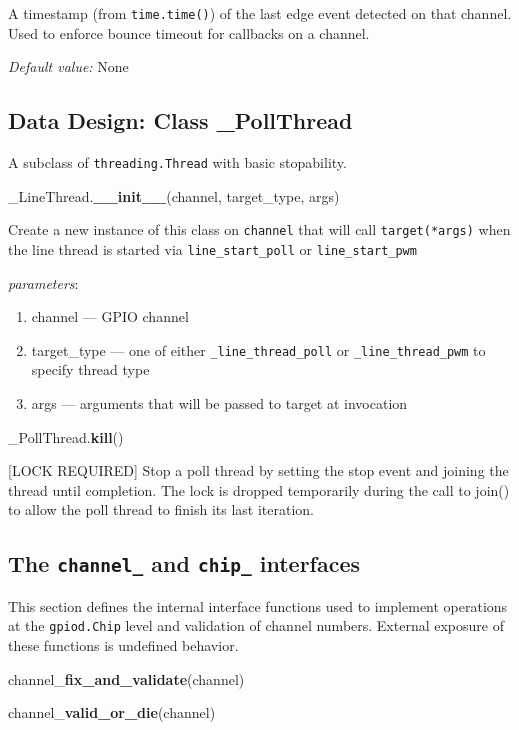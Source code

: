 \documentclass[12pt]{article}
\begin{document}
A timestamp (from \texttt{time.time()}) of the last edge event detected on that channel. Used to enforce bounce timeout for callbacks on a channel.

\textit{Default value:} None


\subsection{Data Design: Class \_PollThread}

A subclass of \texttt{threading.Thread} with basic stopability. 

\medskip

\noindent \_LineThread.\textbf{\_\_init\_\_}(channel, target\_type, args)
        
Create a new instance of this class on \texttt{channel} that will call \texttt{target(*args)} when the line thread is started via \texttt{line\_start\_poll} or \texttt{line\_start\_pwm}

\textit{parameters}:
\begin{enumerate}
        \item channel --- GPIO channel
	\item target\_type --- one of either \texttt{\_line\_thread\_poll} or \texttt{\_line\_thread\_pwm} to specify thread type
        \item args --- arguments that will be passed to target at invocation
\end{enumerate}
 

\noindent \_PollThread.\textbf{kill}()

[LOCK REQUIRED] Stop a poll thread by setting the stop event and joining the thread until completion. The lock is dropped temporarily during the call to join() to allow the poll thread to finish its last iteration.

\subsection{The  \texttt{channel\_} and \texttt{chip\_} interfaces}

This section defines the internal interface functions used to implement operations at the \texttt{gpiod.Chip} level and validation of channel numbers. External exposure of these functions is undefined behavior.

\medskip

\noindent channel\_\textbf{fix\_and\_validate}(channel)

\noindent channel\_\textbf{valid\_or\_die}(channel)
\end{document}
